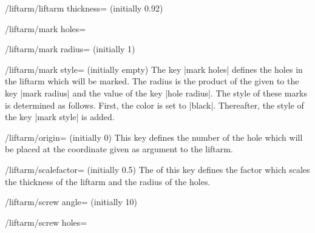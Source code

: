 \documentclass[a4paper,english,dvipsnames]{ltxdoc}
\begin{document}
\begin{command}{\liftarm{}}
\begin{key}{/liftarm/liftarm thickness= (initially 0.92)}
\end{key}
\begin{key}{/liftarm/mark holes=}
\end{key}
\begin{key}{/liftarm/mark radius= (initially 1)}
\end{key}
\begin{stylekey}{/liftarm/mark style= (initially \normalfont empty)}
The key |mark holes| defines the holes in the liftarm which will be marked. The radius is the product of the  given to the key |mark radius| and the value of the key |hole radius|. The style of these marks is determined as follows. First, the color is set to |black|. Thereafter, the style of the key |mark style| is added.
\begin{codeexample}[width=10cm]
\end{codeexample}
\end{stylekey}
\begin{key}{/liftarm/origin= (initially 0)}
This key defines the number of the hole which will be placed at the coordinate given as argument to the liftarm.
\begin{codeexample}[width=10cm]
\end{codeexample}
\end{key}
\begin{key}{/liftarm/scalefactor= (initially 0.5)}
The  of this key defines the factor which scales the thickness of the liftarm and the radius of the holes.
\begin{codeexample}[width=10cm]
\end{codeexample}
\end{key}
\begin{key}{/liftarm/screw angle= (initially 10)}
\end{key}
\begin{key}{/liftarm/screw holes=}

\end{key}
\end{command}
\end{document}
